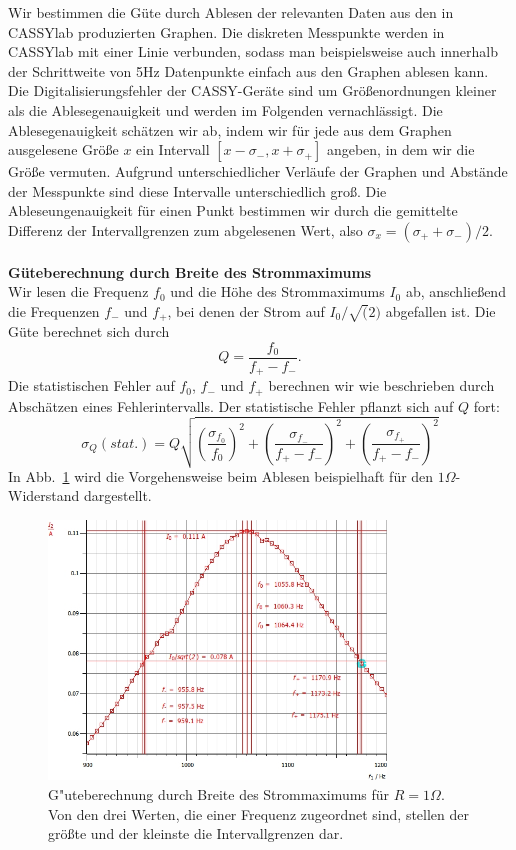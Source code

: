 \documentclass[12pt,a4paper]{article}
\begin{document}
Wir bestimmen die Güte durch Ablesen der relevanten Daten aus den in CASSYlab produzierten Graphen. Die diskreten Messpunkte werden in CASSYlab mit einer Linie verbunden, sodass man beispielsweise auch innerhalb der Schrittweite von 5Hz Datenpunkte einfach aus den Graphen ablesen kann.
Die Digitalisierungsfehler der CASSY-Geräte sind um Größenordnungen kleiner als die Ablesegenauigkeit und werden im Folgenden vernachlässigt. Die Ablesegenauigkeit schätzen wir ab, indem wir für jede aus dem Graphen ausgelesene Größe $x$ ein Intervall $[x-\sigma_-,x+\sigma_+]$ angeben, in dem wir die Größe vermuten. Aufgrund unterschiedlicher Verläufe der Graphen und Abstände der Messpunkte sind diese Intervalle unterschiedlich groß. Die Ableseungenauigkeit für einen Punkt bestimmen wir durch die gemittelte Differenz der Intervallgrenzen zum abgelesenen Wert, also $\sigma_x=(\sigma_++\sigma_-)/2$.\\
\\
\textbf{Güteberechnung durch Breite des Strommaximums}\\
Wir lesen die Frequenz $f_0$ und die Höhe des Strommaximums $I_0$ ab, anschließend die Frequenzen $f_- $ und $f_+$, bei denen der Strom auf $I_0/\sqrt(2)$ abgefallen ist.  Die Güte berechnet sich durch
\begin{equation}
Q=\frac{f_0}{f_+-f_-}.
\end{equation}
Die statistischen Fehler auf $f_0$, $f_-$ und $f_+$ berechnen wir wie beschrieben durch Abschätzen eines Fehlerintervalls. Der statistische Fehler pflanzt sich auf $Q$ fort:
\begin{equation}\label{eq:Fehlerfortpflanzung_Qdurchf}
\sigma_Q(stat.)=Q\sqrt{\left(\frac{\sigma_{f_0}}{f_0}\right)^2+\left(\frac{\sigma_{f_-}}{f_+-f_-}\right)^2+\left(\frac{\sigma_{f_+}}{f_+-f_-}\right)^2}
\end{equation}
In Abb.~\ref{S1Ohm_f0} wird die Vorgehensweise beim Ablesen beispielhaft für den $1\Omega$-Widerstand dargestellt.
\begin{figure}[H]
	\centering
	\includegraphics[width=0.8\textwidth]{Daten/S1_f0.jpg}
	\caption{G"uteberechnung durch Breite des Strommaximums für $R=1\Omega$. Von den drei Werten, die einer Frequenz zugeordnet sind, stellen der größte und der kleinste die Intervallgrenzen dar.}
	\label{S1Ohm_f0}
\end{figure}
\end{document}
